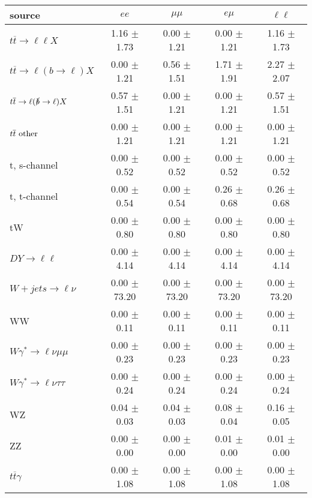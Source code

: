 \begin{tabular}{l|cccc} \hline\hline
source & $ee$ & $\mu\mu$ & $e\mu$ & $\ell\ell $ \\
\hline
$t\overline{t} \rightarrow \ell \ell X$ &  1.16 $\pm$  1.73 &  0.00 $\pm$  1.21 &  0.00 $\pm$  1.21 &  1.16 $\pm$  1.73 \\
$t\overline{t} \rightarrow \ell (b \rightarrow \ell) X$ &  0.00 $\pm$  1.21 &  0.56 $\pm$  1.51 &  1.71 $\pm$  1.91 &  2.27 $\pm$  2.07 \\
$t\overline{t} \rightarrow \ell (\slashed b \rightarrow \ell) X$ &  0.57 $\pm$  1.51 &  0.00 $\pm$  1.21 &  0.00 $\pm$  1.21 &  0.57 $\pm$  1.51 \\
        $t\overline{t}\ \rm{other}$ &  0.00 $\pm$  1.21 &  0.00 $\pm$  1.21 &  0.00 $\pm$  1.21 &  0.00 $\pm$  1.21 \\
\hline
                       t, s-channel &  0.00 $\pm$  0.52 &  0.00 $\pm$  0.52 &  0.00 $\pm$  0.52 &  0.00 $\pm$  0.52 \\
                       t, t-channel &  0.00 $\pm$  0.54 &  0.00 $\pm$  0.54 &  0.26 $\pm$  0.68 &  0.26 $\pm$  0.68 \\
                                 tW &  0.00 $\pm$  0.80 &  0.00 $\pm$  0.80 &  0.00 $\pm$  0.80 &  0.00 $\pm$  0.80 \\
\hline
         $DY \rightarrow \ell \ell$ &  0.00 $\pm$  4.14 &  0.00 $\pm$  4.14 &  0.00 $\pm$  4.14 &  0.00 $\pm$  4.14 \\
      $W+jets \rightarrow \ell \nu$ &  0.00 $\pm$ 73.20 &  0.00 $\pm$ 73.20 &  0.00 $\pm$ 73.20 &  0.00 $\pm$ 73.20 \\
                                 WW &  0.00 $\pm$  0.11 &  0.00 $\pm$  0.11 &  0.00 $\pm$  0.11 &  0.00 $\pm$  0.11 \\
\hline
$W\gamma^{*} \rightarrow \ell \nu \mu\mu$ &  0.00 $\pm$  0.23 &  0.00 $\pm$  0.23 &  0.00 $\pm$  0.23 &  0.00 $\pm$  0.23 \\
$W\gamma^{*} \rightarrow \ell \nu \tau\tau$ &  0.00 $\pm$  0.24 &  0.00 $\pm$  0.24 &  0.00 $\pm$  0.24 &  0.00 $\pm$  0.24 \\
                                 WZ &  0.04 $\pm$  0.03 &  0.04 $\pm$  0.03 &  0.08 $\pm$  0.04 &  0.16 $\pm$  0.05 \\
                                 ZZ &  0.00 $\pm$  0.00 &  0.00 $\pm$  0.00 &  0.01 $\pm$  0.00 &  0.01 $\pm$  0.00 \\
\hline
              $t\overline{t}\gamma$ &  0.00 $\pm$  1.08 &  0.00 $\pm$  1.08 &  0.00 $\pm$  1.08 &  0.00 $\pm$  1.08 \\

\end{tabular}
